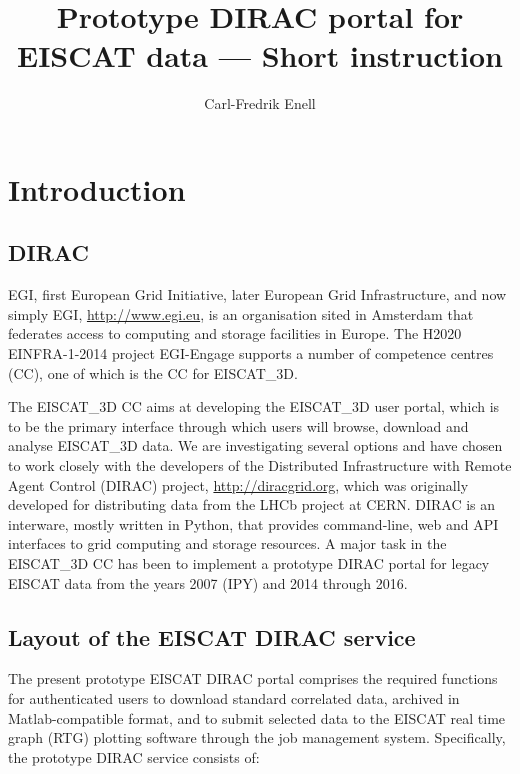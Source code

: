 \documentclass[a4paper]{article}
\title{Prototype DIRAC portal for EISCAT data --- Short instruction}
\author{Carl-Fredrik Enell}
\newcommand{\etd}{EISCAT\_3D}
\begin{document}
\maketitle{}

\section{Introduction}
\label{sec:intro}

\subsection{DIRAC}
\label{sec:dirac}

EGI, first European Grid Initiative, later European Grid
Infrastructure, and now simply EGI, \url{http://www.egi.eu}, is an
organisation sited in Amsterdam that federates access to computing and
storage facilities in Europe. The H2020 EINFRA-1-2014 project
EGI-Engage supports a number of competence centres (CC), one of which
is the CC for \etd{}.

The \etd{} CC aims at developing the \etd{} user portal, which is to be the
primary interface through which users will browse, download and
analyse \etd{} data.  We are investigating several options and have
chosen to work closely with the developers of the Distributed
Infrastructure with Remote Agent Control (DIRAC) project,
\url{http://diracgrid.org}, which was originally developed for
distributing data from the LHCb project at CERN. DIRAC is an
interware, mostly written in Python, that provides command-line, web
and API interfaces to grid computing and storage resources. A major
task in the \etd{} CC has been to implement a prototype DIRAC portal
for legacy EISCAT data from the years 2007 (IPY) and 2014 through
2016.

\subsection{Layout of the EISCAT DIRAC service}
\label{sec:eiscat-dirac}

 
The present prototype EISCAT DIRAC portal comprises the required
functions for authenticated users to download standard correlated
data, archived in Matlab-compatible format, and to submit selected
data to the EISCAT real time graph (RTG) plotting software through the
job management system. Specifically, the prototype DIRAC service
consists of:
\end{document}
